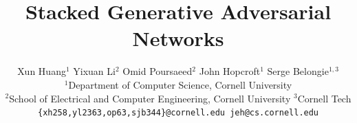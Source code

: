 \documentclass[10pt,twocolumn,letterpaper]{article}
\begin{document}
\title{Stacked Generative Adversarial Networks}


\author{Xun Huang$^{1}$ \qquad Yixuan Li$^{2}$ \qquad Omid Poursaeed$^{2}$  \qquad John Hopcroft$^{1}$ \qquad Serge Belongie$^{1,3}$ \\
	$^1${Department of Computer Science, Cornell University}\\
    $^2${School of Electrical and Computer Engineering, Cornell University}\quad
	$^3${Cornell Tech}\\
	{\tt\small \{xh258,yl2363,op63,sjb344\}@cornell.edu jeh@cs.cornell.edu}
}



\maketitle
\end{document}
